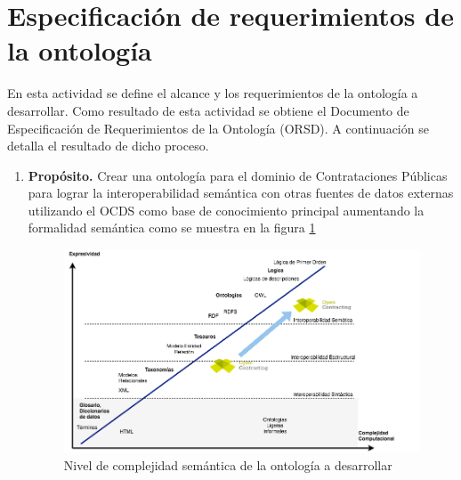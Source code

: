 \section{Especificación de requerimientos de la ontología}

En esta actividad se define el alcance y los requerimientos de la ontología a desarrollar. Como resultado de esta actividad se obtiene el Documento de Especificación de Requerimientos de la Ontología (ORSD). A continuación se detalla el resultado de dicho proceso.
\begin{enumerate}
\item \textbf{Propósito.} Crear una ontología para el dominio de Contrataciones Públicas para lograr la interoperabilidad semántica con otras fuentes de datos externas utilizando el OCDS como base de conocimiento principal aumentando la formalidad semántica como se muestra en la figura \ref{img:ocds-ocntology-complejidad}

\begin{figure}[htbp!]
\centering
\includegraphics[width=150mm]{figuras/Diagramas-OenContracting.png}
\caption{Nivel de complejidad semántica de la ontología a desarrollar}
\label{img:ocds-ocntology-complejidad}
\end{figure}



\end{enumerate}
